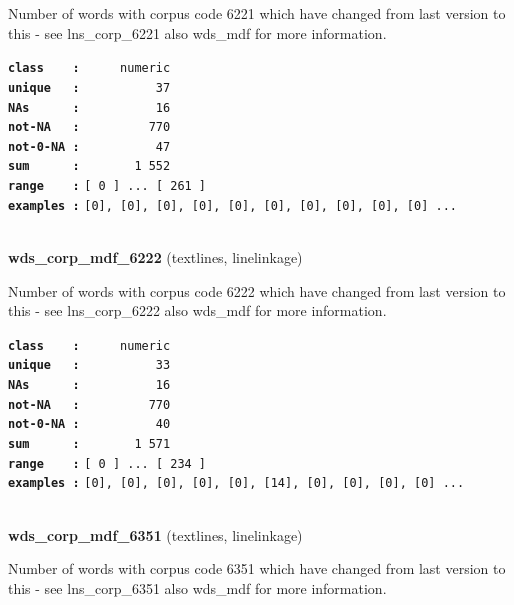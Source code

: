 \documentclass[]{article}
\begin{document}
Number of words with corpus code 6221 which have changed from last
version to this - see lns\_corp\_6221 also wds\_mdf for more
information.

\textbf{\texttt{class\ \ \ \ :}} \texttt{~~~~~numeric}\\
\textbf{\texttt{unique\ \ \ :}} \texttt{~~~~~~~~~~37}\\
\textbf{\texttt{NAs\ \ \ \ \ \ :}} \texttt{~~~~~~~~~~16}\\
\textbf{\texttt{not-NA\ \ \ :}} \texttt{~~~~~~~~~770}\\
\textbf{\texttt{not-0-NA\ :}} \texttt{~~~~~~~~~~47}\\
\textbf{\texttt{sum\ \ \ \ \ \ :}} \texttt{~~~~~~~1~552}\\
\textbf{\texttt{range\ \ \ \ :}}
\texttt{{[}\ 0\ {]}\ ...\ {[}\ 261\ {]}}\\
\textbf{\texttt{examples\ :}}
\texttt{{[}0{]},\ {[}0{]},\ {[}0{]},\ {[}0{]},\ {[}0{]},\ {[}0{]},\ {[}0{]},\ {[}0{]},\ {[}0{]},\ {[}0{]}\ ...}\\

~

\textbf{wds\_corp\_mdf\_6222} (textlines, linelinkage)

Number of words with corpus code 6222 which have changed from last
version to this - see lns\_corp\_6222 also wds\_mdf for more
information.

\textbf{\texttt{class\ \ \ \ :}} \texttt{~~~~~numeric}\\
\textbf{\texttt{unique\ \ \ :}} \texttt{~~~~~~~~~~33}\\
\textbf{\texttt{NAs\ \ \ \ \ \ :}} \texttt{~~~~~~~~~~16}\\
\textbf{\texttt{not-NA\ \ \ :}} \texttt{~~~~~~~~~770}\\
\textbf{\texttt{not-0-NA\ :}} \texttt{~~~~~~~~~~40}\\
\textbf{\texttt{sum\ \ \ \ \ \ :}} \texttt{~~~~~~~1~571}\\
\textbf{\texttt{range\ \ \ \ :}}
\texttt{{[}\ 0\ {]}\ ...\ {[}\ 234\ {]}}\\
\textbf{\texttt{examples\ :}}
\texttt{{[}0{]},\ {[}0{]},\ {[}0{]},\ {[}0{]},\ {[}0{]},\ {[}14{]},\ {[}0{]},\ {[}0{]},\ {[}0{]},\ {[}0{]}\ ...}\\

~

\textbf{wds\_corp\_mdf\_6351} (textlines, linelinkage)

Number of words with corpus code 6351 which have changed from last
version to this - see lns\_corp\_6351 also wds\_mdf for more
information.
\end{document}
